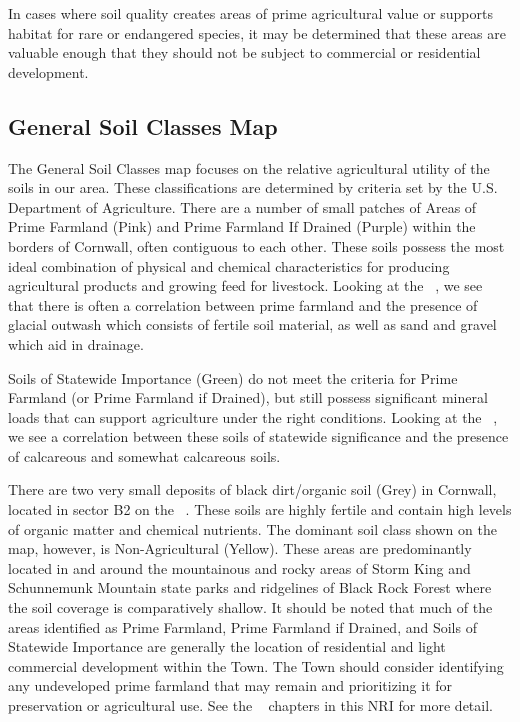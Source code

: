 In cases where soil quality creates areas of prime agricultural value or 
supports habitat for rare or endangered species, it may be determined that these 
areas are valuable enough that they should not be subject to commercial or 
residential development.

\label{map:generalsoilclasses}

\subsection*{General Soil Classes Map}\label{subsec:generalsoil}
The General Soil Classes map focuses on the relative agricultural utility of 
the soils in our area. These classifications are determined by criteria set by 
the U.S. Department of Agriculture. There are a number of small patches of 
Areas of Prime Farmland (Pink) and Prime Farmland If Drained (Purple) within 
the borders of Cornwall, often contiguous to each other. These soils possess 
the most ideal combination of physical and chemical characteristics for 
producing agricultural products and growing feed for livestock. Looking at the 
~, we see that there is often a 
correlation between prime farmland and the presence of glacial outwash which 
consists of fertile soil material, as well as sand and gravel which aid in 
drainage.

Soils of Statewide Importance (Green) do not meet the criteria for Prime 
Farmland (or Prime Farmland if Drained), but still possess significant mineral 
loads that can support agriculture under the right conditions. Looking at the 
~, we see a correlation between these 
soils of statewide significance and the presence of calcareous and somewhat 
calcareous soils.

There are two very small deposits of black dirt/organic soil (Grey) in Cornwall, 
located in sector B2 on the ~. These soils are highly 
fertile and contain high levels of organic matter and chemical nutrients. The 
dominant soil class shown on the ~ map, however, is 
Non-Agricultural (Yellow). These areas are predominantly located in and around 
the mountainous and rocky areas of Storm King and Schunnemunk Mountain state 
parks and ridgelines of Black Rock Forest where the soil coverage is 
comparatively shallow. It should be noted that much of the areas identified as 
Prime Farmland, Prime Farmland if Drained, and Soils of Statewide Importance are 
generally the location of residential and light commercial development within 
the Town. The Town should consider identifying any undeveloped prime farmland 
that may remain and prioritizing it for preservation or agricultural use. See 
the ~ chapters in this NRI for more detail.

